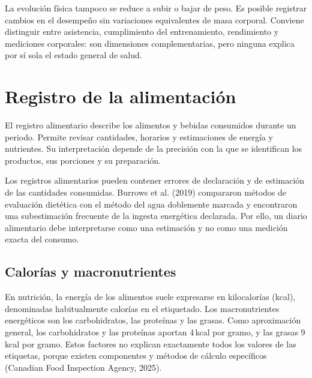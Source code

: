 La evolución física tampoco se reduce a subir o bajar de peso. Es posible registrar cambios en el desempeño sin variaciones equivalentes de masa corporal. Conviene distinguir entre asistencia, cumplimiento del entrenamiento, rendimiento y mediciones corporales: son dimensiones complementarias, pero ninguna explica por sí sola el estado general de salud.

\section{Registro de la alimentación}
\label{sec:registro-alimentacion}

El registro alimentario describe los alimentos y bebidas consumidos durante un periodo. Permite revisar cantidades, horarios y estimaciones de energía y nutrientes. Su interpretación depende de la precisión con la que se identifican los productos, sus porciones y su preparación.

Los registros alimentarios pueden contener errores de declaración y de estimación de las cantidades consumidas. Burrows et al. (2019) compararon métodos de evaluación dietética con el método del agua doblemente marcada y encontraron una subestimación frecuente de la ingesta energética declarada. Por ello, un diario alimentario debe interpretarse como una estimación y no como una medición exacta del consumo.

\subsection{Calorías y macronutrientes}

En nutrición, la energía de los alimentos suele expresarse en kilocalorías (kcal), denominadas habitualmente calorías en el etiquetado. Los macronutrientes energéticos son los carbohidratos, las proteínas y las grasas. Como aproximación general, los carbohidratos y las proteínas aportan 4\,kcal por gramo, y las grasas 9\,kcal por gramo. Estos factores no explican exactamente todos los valores de las etiquetas, porque existen componentes y métodos de cálculo específicos (Canadian Food Inspection Agency, 2025).

